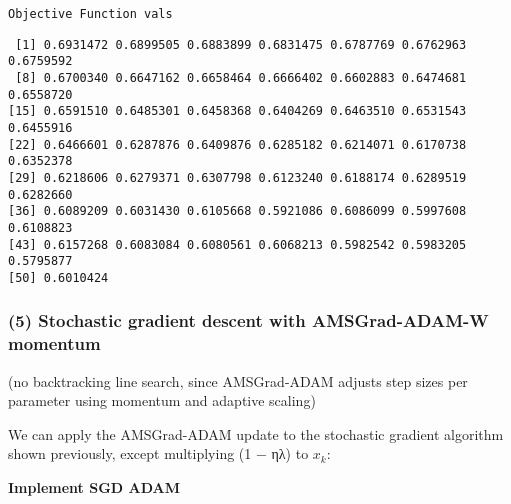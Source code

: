 \documentclass[
  letterpaper,
  DIV=11,
  numbers=noendperiod]{scrartcl}
\newenvironment{Shaded}{\begin{snugshade}}{\end{snugshade}}
\newcommand{\DecValTok}[1]{\textcolor[rgb]{0.68,0.00,0.00}{#1}}
\newcommand{\FunctionTok}[1]{\textcolor[rgb]{0.28,0.35,0.67}{#1}}
\newcommand{\NormalTok}[1]{\textcolor[rgb]{0.00,0.23,0.31}{#1}}
\newcommand{\SpecialCharTok}[1]{\textcolor[rgb]{0.37,0.37,0.37}{#1}}
\begin{document}
\begin{verbatim}
Objective Function vals 
\end{verbatim}

\begin{Shaded}
\end{Shaded}

\begin{verbatim}
 [1] 0.6931472 0.6899505 0.6883899 0.6831475 0.6787769 0.6762963 0.6759592
 [8] 0.6700340 0.6647162 0.6658464 0.6666402 0.6602883 0.6474681 0.6558720
[15] 0.6591510 0.6485301 0.6458368 0.6404269 0.6463510 0.6531543 0.6455916
[22] 0.6466601 0.6287876 0.6409876 0.6285182 0.6214071 0.6170738 0.6352378
[29] 0.6218606 0.6279371 0.6307798 0.6123240 0.6188174 0.6289519 0.6282660
[36] 0.6089209 0.6031430 0.6105668 0.5921086 0.6086099 0.5997608 0.6108823
[43] 0.6157268 0.6083084 0.6080561 0.6068213 0.5982542 0.5983205 0.5795877
[50] 0.6010424
\end{verbatim}

\subsubsection{(5) Stochastic gradient descent with AMSGrad-ADAM-W
momentum}\label{stochastic-gradient-descent-with-amsgrad-adam-w-momentum}

(no backtracking line search, since AMSGrad-ADAM adjusts step sizes per
parameter using momentum and adaptive scaling)

We can apply the AMSGrad-ADAM update to the stochastic gradient
algorithm shown previously, except multiplying (1 − ηλ) to \(x_k\):

\textbf{Implement SGD ADAM}
\end{document}
